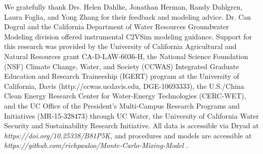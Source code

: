 \begin{changemargin}{0cm}{1.0cm}
We gratefully thank Drs. Helen Dahlke, Jonathan Herman, Randy Dahlgren, Laura Foglia, and Yong Zhang for their feedback and modeling advice. Dr. Can Dogrul and the California Department of Water Resources Groundwater Modeling division offered instrumental C2VSim modeling guidance. Support for this research was provided by the University of California Agricultural and Natural Resources grant CA-D-LAW-6036-H, the National Science Foundation (NSF) Climate Change, Water, and Society (CCWAS) Integrated Graduate Education and Research Traineeship (IGERT) program at the University of California, Davis (http://ccwas.ucdavis.edu, DGE-10693333), the U.S./China Clean Energy Research Center for Water-Energy Technologies (CERC-WET), and
the UC Office of the President’s Multi-Campus Research Programs and
Initiatives (MR-15-328473) through UC Water, the University of
California Water Security and Sustainability Research Initiative. All data is accessible via Dryad at \textit{https://doi.org/10.25338/B81P5K}, and procedures and models are accessible at \textit{https://github.com/richpauloo/Monte-Carlo-Mixing-Model} \citep{Pauloo2020}.  
\end{changemargin}

\clearpage